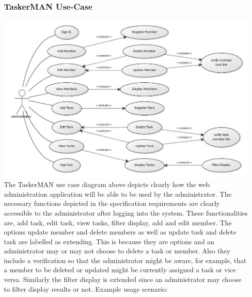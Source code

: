 \documentclass{project}
\begin{document}
\subsubsection{TaskerMAN Use-Case}
\includegraphics[width=\textwidth]{images/5.1/TaskerMANUseCase}
The TaskerMAN use case diagram above depicts clearly how the web administration application will be able to be used by the administrator.  The necessary functions depicted in the specification requirements\cite{se.qa.rs} are clearly accessible to the administrator after logging into the system. These functionalities are, add task, edit task, view tasks, filter display, add and edit member. The options update member and delete members as well as update task and delete task are labelled as extending.  This is because they are options and an administrator may or may not choose to delete a task or member.  Also they include a verification so that the administrator might be aware, for example, that a member to be deleted or updated might be currently assigned a task or vice versa.  Similarly the filter display is extended since an administrator may choose to filter display results or not.
Example usage scenario:
\end{document}
